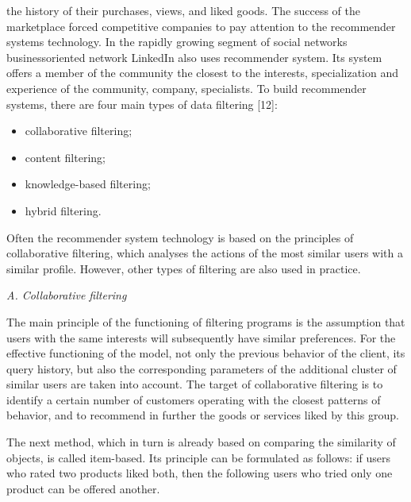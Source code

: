 \documentclass[10pt, a4paper]{article}
\begin{document}
\begin{multicols}{2}


\noindent\normalsize the history of their purchases, views, and liked goods. The
success of the marketplace forced competitive companies
to pay attention to the recommender systems technology. In
the rapidly growing segment of social networks business\-oriented network LinkedIn also uses recommender system.
Its system offers a member of the community the closest
to the interests, specialization and experience of the
community, company, specialists. To build recommender
systems, there are four main types of data filtering [12]:

\vspace{-0.9em}
\begin{itemize}[itemsep=0pt, parsep=0pt]
\item collaborative filtering;
\item content filtering;
\item knowledge-based filtering;
\item hybrid filtering.
\end{itemize}
\vspace{-0.9em}

 Often the recommender system technology is based on
the principles of collaborative filtering, which analyses
the actions of the most similar users with a similar profile.
However, other types of filtering are also used in practice.

\vspace{-0.5em}
\begin{flushleft}
 \textit{A. Collaborative filtering}
 \end{flushleft}
 \vspace{-0.9em}

\hspace{-1.3em}
The main principle of the functioning of filtering
programs is the assumption that users with the same
interests will subsequently have similar preferences. For
the effective functioning of the model, not only the
previous behavior of the client, its query history, but also
the corresponding parameters of the additional cluster
of similar users are taken into account. The target of
collaborative filtering is to identify a certain number of
customers operating with the closest patterns of behavior,
and to recommend in further the goods or services liked
by this group.\par
The next method, which in turn is already based on
comparing the similarity of objects, is called item-based.
Its principle can be formulated as follows: if users who
rated two products liked both, then the following users
who tried only one product can be offered another.


\end{multicols}
\end{document}
